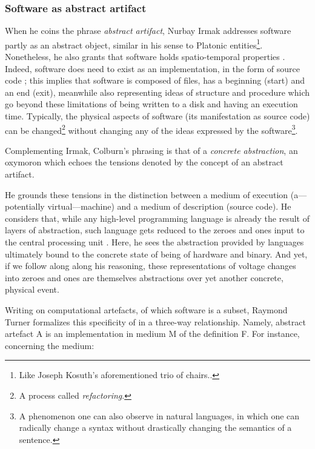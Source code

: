 \subsubsection{Software as abstract artifact}
\label{subsubsec:abstract-artifact}

When he coins the phrase \emph{abstract artifact}, Nurbay Irmak addresses software partly as an abstract object, similar in his sense to Platonic entities\footnote{Like Joseph Kosuth's aforementioned trio of chairs..}. Nonetheless, he also grants that software holds spatio-temporal properties \citep{irmak_software_2012}. Indeed, software does need to exist as an implementation, in the form of source code \citep{suber_what_1988}; this implies that software is composed of files, has a beginning (start) and an end (exit), meanwhile also representing ideas of structure and procedure which go beyond these limitations of being written to a disk and having an execution time. Typically, the physical aspects of software (its manifestation as source code) can be changed\footnote{A process called \emph{refactoring}.} without changing any of the ideas expressed by the software\footnote{A phenomenon one can also observe in natural languages, in which one can radically change a syntax without drastically changing the semantics of a sentence.}.

Complementing Irmak, Colburn's phrasing is that of a \emph{concrete abstraction}, an oxymoron which echoes the tensions denoted by the concept of an abstract artifact.

He grounds these tensions in the distinction between a medium of execution (a—potentially virtual—machine) and a medium of description (source code). He considers that, while any high-level programming language is already the result of layers of abstraction, such language gets reduced to the zeroes and ones input to the central processing unit \citep{colburn_philosophy_2000}. Here, he sees the abstraction provided by languages ultimately bound to the concrete state of being of hardware and binary. And yet, if we follow along along his reasoning, these representations of voltage changes into zeroes and ones are themselves abstractions over yet another concrete, physical event.

Writing on computational artefacts, of which software is a subset, Raymond Turner formalizes this specificity of in a three-way relationship. Namely, abstract artefact A is an implementation in medium M of the definition F. For instance, concerning the medium:

